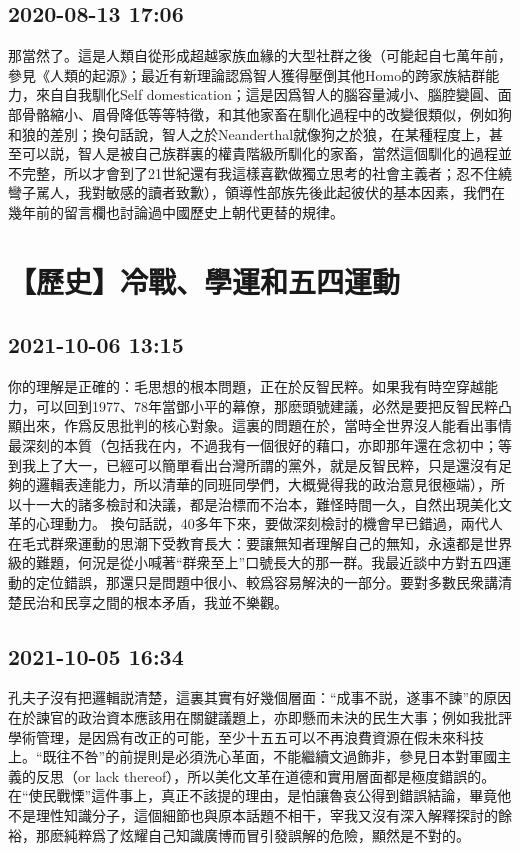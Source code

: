 \documentclass[twocolumn]{ctexart}
\begin{document}
\subsection*{2020-08-13 17:06}

那當然了。這是人類自從形成超越家族血緣的大型社群之後（可能起自七萬年前，參見《人類的起源》；最近有新理論認爲智人獲得壓倒其他Homo的跨家族結群能力，來自自我馴化Self domestication；這是因爲智人的腦容量減小、腦腔變圓、面部骨骼縮小、眉骨降低等等特徵，和其他家畜在馴化過程中的改變很類似，例如狗和狼的差別；換句話說，智人之於Neanderthal就像狗之於狼，在某種程度上，甚至可以説，智人是被自己族群裏的權貴階級所馴化的家畜，當然這個馴化的過程並不完整，所以才會到了21世紀還有我這樣喜歡做獨立思考的社會主義者；忍不住繞彎子駡人，我對敏感的讀者致歉），領導性部族先後此起彼伏的基本因素，我們在幾年前的留言欄也討論過中國歷史上朝代更替的規律。
\section*{【歷史】冷戰、學運和五四運動}
\subsection*{2021-10-06 13:15}

你的理解是正確的：毛思想的根本問題，正在於反智民粹。如果我有時空穿越能力，可以回到1977、78年當鄧小平的幕僚，那麽頭號建議，必然是要把反智民粹凸顯出來，作爲反思批判的核心對象。這裏的問題在於，當時全世界沒人能看出事情最深刻的本質（包括我在内，不過我有一個很好的藉口，亦即那年還在念初中；等到我上了大一，已經可以簡單看出台灣所謂的黨外，就是反智民粹，只是還沒有足夠的邏輯表達能力，所以清華的同班同學們，大概覺得我的政治意見很極端），所以十一大的諸多檢討和決議，都是治標而不治本，難怪時間一久，自然出現美化文革的心理動力。
換句話説，40多年下來，要做深刻檢討的機會早已錯過，兩代人在毛式群衆運動的思潮下受教育長大：要讓無知者理解自己的無知，永遠都是世界級的難題，何況是從小喊著“群衆至上”口號長大的那一群。我最近談中方對五四運動的定位錯誤，那還只是問題中很小、較爲容易解決的一部分。要對多數民衆講清楚民治和民享之間的根本矛盾，我並不樂觀。
\subsection*{2021-10-05 16:34}

孔夫子沒有把邏輯説清楚，這裏其實有好幾個層面：“成事不説，遂事不諫”的原因在於諫官的政治資本應該用在關鍵議題上，亦即懸而未決的民生大事；例如我批評學術管理，是因爲有改正的可能，至少十五五可以不再浪費資源在假未來科技上。“既往不咎”的前提則是必須洗心革面，不能繼續文過飾非，參見日本對軍國主義的反思（or lack thereof），所以美化文革在道德和實用層面都是極度錯誤的。
在“使民戰慄”這件事上，真正不該提的理由，是怕讓魯哀公得到錯誤結論，畢竟他不是理性知識分子，這個細節也與原本話題不相干，宰我又沒有深入解釋探討的餘裕，那麽純粹爲了炫耀自己知識廣博而冒引發誤解的危險，顯然是不對的。
\end{document}
